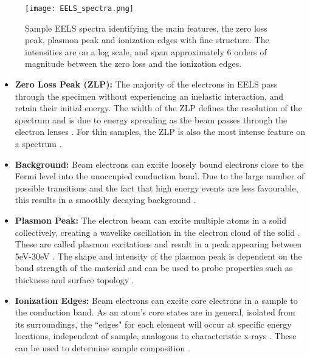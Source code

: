 \begin{figure}
	\centering
	\texttt{[image: EELS\_spectra.png]}
	\caption{Sample EELS spectra identifying the main features, the zero loss peak, plasmon peak and ionization edges with fine structure.   The intensities are on a log scale, and span approximately 6 orders of magnitude between the zero loss and the ionization edges.  }
	\label{EELS_spectra}
\end{figure}

\begin{itemize}
	\item \textbf{Zero Loss Peak (ZLP):} The majority of the electrons in EELS pass through the specimen without experiencing an inelastic interaction, and retain their initial energy.  The width of the ZLP defines the resolution of the spectrum and is due to energy spreading as the beam passes through the electron lenses \cite{colliex_illustrated_1985}.  For thin samples, the ZLP is also the most intense feature on a spectrum \cite{Egerton}.  
	
	\item  \textbf{Background:} Beam electrons can excite loosely bound electrons close to the Fermi level into the unoccupied conduction band.  Due to the large number of possible transitions and the fact that high energy events are less favourable, this results in a smoothly decaying background \cite{Egerton}.
	
	\item \textbf{Plasmon Peak:}  The electron beam can excite multiple atoms in a solid collectively, creating a wavelike oscillation in the electron cloud of the solid \cite{Egerton}.  These are called plasmon excitations and result in a peak appearing between 5eV-30eV \cite{Egerton}.  The shape and intensity of the plasmon peak is dependent on the bond strength of the material and can be used to probe properties such as thickness and surface topology \cite{malis_eels_1988,nelayah_mapping_2007}. 
	
	\item \textbf{Ionization Edges:} Beam electrons can excite core electrons in a sample to the conduction band.  As an atom's core states are in general, isolated from its surroundings, the ``edges" for each element will occur at specific energy locations, independent of sample, analogous to characteristic x-rays \cite{Egerton}. These can be used to determine sample composition \cite{Egerton}.  
	
	
	
\end{itemize}
 

